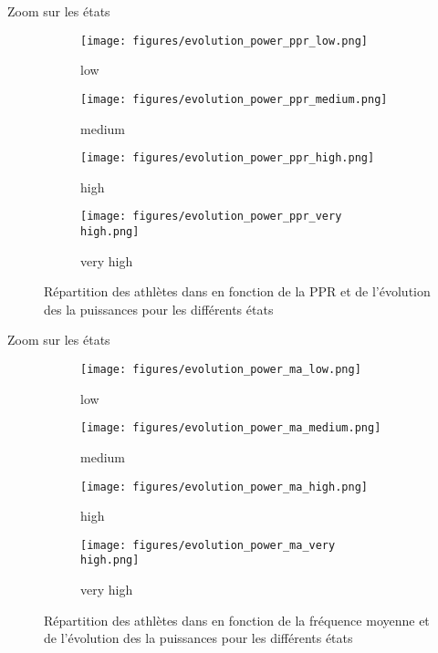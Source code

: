 \documentclass{beamer}
\begin{document}
\begin{frame}{Zoom sur les états}
    \begin{figure}
        \centering
        \begin{subfigure}{0.45\textwidth}
            \centering
            \texttt{[image: figures/evolution\_power\_ppr\_low.png]}
            \caption{low}
        \end{subfigure}
        \begin{subfigure}{0.45\textwidth}
            \centering
            \texttt{[image: figures/evolution\_power\_ppr\_medium.png]}
            \caption{medium}
        \end{subfigure}
        \begin{subfigure}{0.45\textwidth}
            \centering
            \texttt{[image: figures/evolution\_power\_ppr\_high.png]}
            \caption{high}
        \end{subfigure}
        \begin{subfigure}{0.45\textwidth}
            \centering
            \texttt{[image: figures/evolution\_power\_ppr\_very high.png]}
            \caption{very high}
        \end{subfigure}
        \caption*{Répartition des athlètes dans en fonction de la PPR et de l'évolution des la puissances pour les différents états}
    \end{figure}
\end{frame}
\begin{frame}{Zoom sur les états}
    \begin{figure}
        \centering
        \begin{subfigure}{0.45\textwidth}
            \centering
            \texttt{[image: figures/evolution\_power\_ma\_low.png]}
            \caption{low}
        \end{subfigure}
        \begin{subfigure}{0.45\textwidth}
            \centering
            \texttt{[image: figures/evolution\_power\_ma\_medium.png]}
            \caption{medium}
        \end{subfigure}
        \begin{subfigure}{0.45\textwidth}
            \centering
            \texttt{[image: figures/evolution\_power\_ma\_high.png]}
            \caption{high}
        \end{subfigure}
        \begin{subfigure}{0.45\textwidth}
            \centering
            \texttt{[image: figures/evolution\_power\_ma\_very high.png]}
            \caption{very high}
        \end{subfigure}
        \caption*{Répartition des athlètes dans en fonction de la fréquence moyenne et de l'évolution des la puissances pour les différents états}
    \end{figure}
\end{frame}
\end{document}
